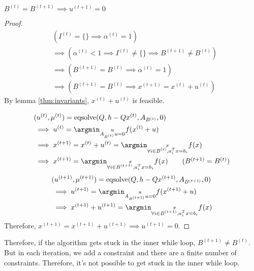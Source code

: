 \begin{lemma}
$B^{(t)} = B^{(t+1)} \implies u^{(t+1)} = 0$
\end{lemma}
\begin{proof}
\begin{align*}
& (I^{(t)} = \{\} \implies \alpha^{(t)} = 1)
\\ &\implies (\alpha^{(t)} < 1 \implies I^{(t)} \neq \{\} \implies B^{(t+1)} \neq B^{(t)})
\\ &\implies (B^{(t+1)} = B^{(t)} \implies \alpha^{(t)} = 1)
\\ &\implies (B^{(t+1)} = B^{(t)} \implies x^{(t+1)} = x^{(t)} + u^{(t)})
\end{align*}
By lemma \ref{thm:invariants}, $x^{(t)} + u^{(t)}$ is feasible.

\begin{align*}
& (u^{(t)}, \mu^{(t)}) = \operatorname{eqsolve}(Q, h - Qx^{(t)}, A_{B^{(t)}}, 0)
\\ &\implies u^{(t)} = \argmin_{\substack{u \\ A_{B^{(t)}}u = 0}} f(x^{(t)} + u)
\\ &\implies x^{(t+1)} = x^{(t)} + u^{(t)}
= \argmin_{\substack{x \\ \forall i \in B^{(t)}, a_i^Tx = b_i}} f(x)
\\ &\implies x^{(t+1)}
= \argmin_{\substack{x \\ \forall i \in B^{(t+1)}, a_i^Tx = b_i}} f(x) \tag{$B^{(t+1)} = B^{(t)}$}
\end{align*}
\begin{align*}
& (u^{(t+1)}, \mu^{(t+1)}) = \operatorname{eqsolve}(Q, h - Qx^{(t+1)}, A_{B^{(t+1)}}, 0)
\\ &\implies u^{(t+1)} = \argmin_{\substack{u \\ A_{B^{(t+1)}}u = 0}} f(x^{(t+1)} + u)
\\ &\implies x^{(t+1)} + u^{(t+1)}
= \argmin_{\substack{x \\ \forall i \in B^{(t+1)}, a_i^Tx = b_i}} f(x)
\end{align*}
Therefore, $x^{(t+1)} = x^{(t+1)} + u^{(t+1)} \implies u^{(t+1)} = 0$.
\end{proof}

Therefore, if the algorithm gets stuck in the inner while loop, $B^{(t+1)} \neq B^{(t)}$.
But in each iteration, we add a constraint and there are a finite number of constraints.
Therefore, it's not possible to get stuck in the inner while loop.

